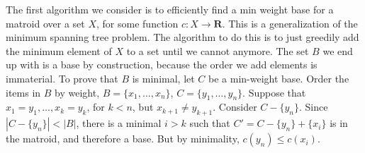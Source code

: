 The first algorithm we consider is to efficiently find a min weight base for a matroid over a set $X$, for some function $c: X \to \mathbf{R}$. This is a generalization of the minimum spanning tree problem. The algorithm to do this is to just greedily add the minimum element of $X$ to a set until we cannot anymore. The set $B$ we end up with is a base by construction, because the order we add elements is immaterial. To prove that $B$ is minimal, let $C$ be a min-weight base. Order the items in $B$ by weight, $B = \{ x_1, \dots, x_n \}$, $C = \{ y_1, \dots, y_n \}$. Suppose that $x_1 = y_1, \dots, x_k = y_k$, for $k < n$, but $x_{k+1} \neq y_{k+1}$. Consider $C - \{ y_n \}$. Since $|C - \{ y_n \}| < |B|$, there is a minimal $i > k$ such that $C' = C - \{ y_n \} + \{ x_i \}$ is in the matroid, and therefore a base. But by minimality, $c(y_n) \leq c(x_i)$.

